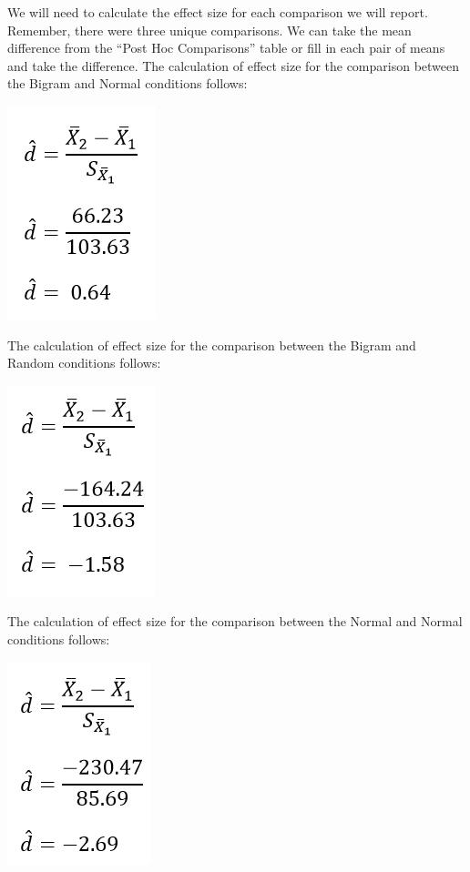 \documentclass[
]{book}
\begin{document}
We will need to calculate the effect size for each comparison we will report. Remember, there were three unique comparisons. We can take the mean difference from the ``Post Hoc Comparisons'' table or fill in each pair of means and take the difference.
The calculation of effect size for the comparison between the Bigram and Normal conditions follows:

\includegraphics{img/EffectSize_BigramsVsNormal.png}

The calculation of effect size for the comparison between the Bigram and Random conditions follows:

\includegraphics{img/EffectSize_BigramsVsRandom.png}

The calculation of effect size for the comparison between the Normal and Normal conditions follows:

\includegraphics{img/EffectSize_NormalVsRandom.png}
\end{document}
